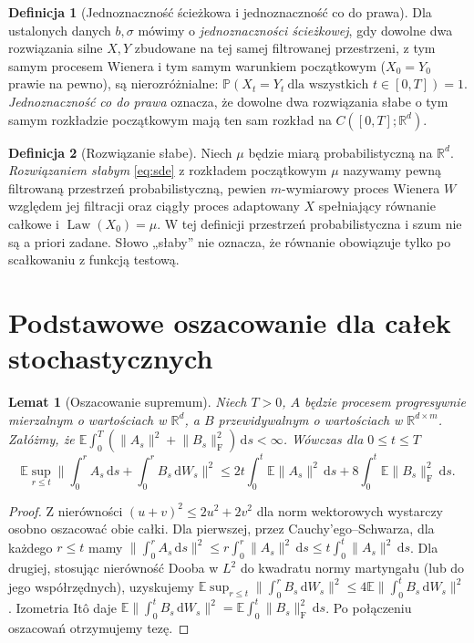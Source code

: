 \documentclass[11pt,a4paper,oneside]{report}
\numberwithin{equation}{chapter}
\theoremstyle{plain}
\newtheorem{lemat}[twierdzenie]{Lemat}
\theoremstyle{definition}
\newtheorem{definicja}{Definicja}[chapter]
\theoremstyle{remark}
\newcommand{\R}{\mathbb{R}}
\newcommand{\Prob}{\mathbb{P}}
\newcommand{\E}{\mathbb{E}}
\newcommand{\Law}{\operatorname{Law}}
\newcommand{\dd}{\mathrm{d}}
\newcommand{\norm}[1]{\lVert #1\rVert}
\begin{document}
\begin{definicja}[Jednoznaczność ścieżkowa i jednoznaczność co do prawa]
Dla ustalonych danych $b,\sigma$ mówimy o
\emph{jednoznaczności ścieżkowej}, gdy dowolne dwa rozwiązania
silne $X,Y$ zbudowane na tej samej filtrowanej przestrzeni,
z tym samym procesem Wienera i tym samym warunkiem początkowym
($X_0=Y_0$ prawie na pewno), są nierozróżnialne:
$\Prob(X_t=Y_t\ \text{dla wszystkich }t\in[0,T])=1$.
\emph{Jednoznaczność co do prawa} oznacza, że dowolne dwa
rozwiązania słabe o tym samym rozkładzie początkowym mają
ten sam rozkład na $C([0,T];\R^d)$.
\end{definicja}

\begin{definicja}[Rozwiązanie słabe]
Niech $\mu$ będzie miarą probabilistyczną na $\R^d$.
\emph{Rozwiązaniem słabym} \eqref{eq:sde} z rozkładem
początkowym $\mu$ nazywamy pewną filtrowaną przestrzeń
probabilistyczną, pewien $m$-wymiarowy proces Wienera $W$
względem jej filtracji oraz ciągły proces adaptowany $X$
spełniający równanie całkowe i $\Law(X_0)=\mu$.
W tej definicji przestrzeń probabilistyczna i szum nie są
a priori zadane. Słowo „słaby” nie oznacza, że równanie
obowiązuje tylko po scałkowaniu z funkcją testową.
\end{definicja}

\section{Podstawowe oszacowanie dla całek stochastycznych}
\begin{lemat}[Oszacowanie supremum]
\label{lem:sde-sup}
Niech $T>0$, $A$ będzie procesem progresywnie mierzalnym
o wartościach w $\R^d$, a $B$ przewidywalnym o wartościach
w $\R^{d\times m}$. Załóżmy, że
$\E\int_0^T(\norm{A_s}^2+\norm{B_s}_{\mathrm F}^2)\,\dd s<\infty$.
Wówczas dla $0\le t\le T$
\[
\E\sup_{r\le t}\norm{\int_0^r A_s\,\dd s+
\int_0^r B_s\,\dd W_s}^2
\le 2t\int_0^t\E\norm{A_s}^2\,\dd s
+8\int_0^t\E\norm{B_s}_{\mathrm F}^2\,\dd s.
\tag{5.2}\label{eq:sde-basic-est}
\]
\end{lemat}
\begin{proof}
Z nierówności $(u+v)^2\le2u^2+2v^2$ dla norm wektorowych
wystarczy osobno oszacować obie całki. Dla pierwszej,
przez Cauchy'ego--Schwarza, dla każdego $r\le t$ mamy
$\norm{\int_0^r A_s\,\dd s}^2
\le r\int_0^r\norm{A_s}^2\,\dd s
\le t\int_0^t\norm{A_s}^2\,\dd s$.
Dla drugiej, stosując nierówność Dooba w $L^2$
do kwadratu normy martyngału (lub do jego współrzędnych),
uzyskujemy
$\E\sup_{r\le t}\norm{\int_0^rB_s\,\dd W_s}^2
\le4\E\norm{\int_0^tB_s\,\dd W_s}^2$.
Izometria Itô daje $\E\norm{\int_0^tB_s\,\dd W_s}^2
=\E\int_0^t\norm{B_s}_{\mathrm F}^2\,\dd s$.
Po połączeniu oszacowań otrzymujemy tezę.
\end{proof}
\end{document}
